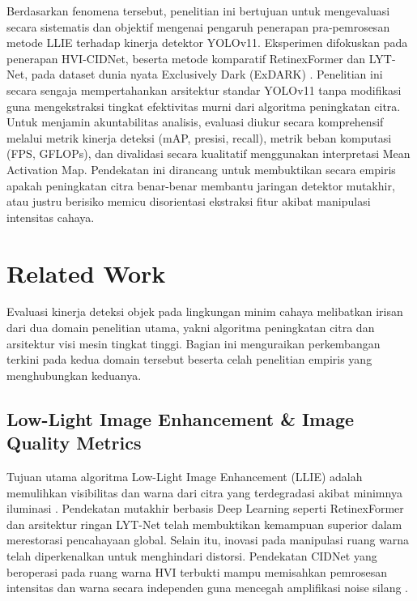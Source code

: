 \documentclass[conference]{IEEEtran}
\begin{document}
Berdasarkan fenomena tersebut, penelitian ini bertujuan untuk mengevaluasi secara sistematis dan objektif mengenai pengaruh penerapan pra-pemrosesan metode LLIE terhadap kinerja detektor YOLOv11. Eksperimen difokuskan pada penerapan HVI-CIDNet, beserta metode komparatif RetinexFormer dan LYT-Net, pada dataset dunia nyata Exclusively Dark (ExDARK) \cite{loh2019exdark}. Penelitian ini secara sengaja mempertahankan arsitektur standar YOLOv11 tanpa modifikasi guna mengekstraksi tingkat efektivitas murni dari algoritma peningkatan citra. Untuk menjamin akuntabilitas analisis, evaluasi diukur secara komprehensif melalui metrik kinerja deteksi (mAP, presisi, recall), metrik beban komputasi (FPS, GFLOPs), dan divalidasi secara kualitatif menggunakan interpretasi Mean Activation Map. Pendekatan ini dirancang untuk membuktikan secara empiris apakah peningkatan citra benar-benar membantu jaringan detektor mutakhir, atau justru berisiko memicu disorientasi ekstraksi fitur akibat manipulasi intensitas cahaya.

\section{Related Work}

Evaluasi kinerja deteksi objek pada lingkungan minim cahaya melibatkan irisan dari dua domain penelitian utama, yakni algoritma peningkatan citra dan arsitektur visi mesin tingkat tinggi. Bagian ini menguraikan perkembangan terkini pada kedua domain tersebut beserta celah penelitian empiris yang menghubungkan keduanya.

\subsection{Low-Light Image Enhancement \& Image Quality Metrics}
Tujuan utama algoritma Low-Light Image Enhancement (LLIE) adalah memulihkan visibilitas dan warna dari citra yang terdegradasi akibat minimnya iluminasi \cite{liu2021benchmark}. Pendekatan mutakhir berbasis Deep Learning seperti RetinexFormer \cite{cai2023retinexformer} dan arsitektur ringan LYT-Net \cite{brateanu2025lytnet} telah membuktikan kemampuan superior dalam merestorasi pencahayaan global. Selain itu, inovasi pada manipulasi ruang warna telah diperkenalkan untuk menghindari distorsi. Pendekatan CIDNet yang beroperasi pada ruang warna HVI terbukti mampu memisahkan pemrosesan intensitas dan warna secara independen guna mencegah amplifikasi noise silang \cite{yan2025hvi}. 
\end{document}
